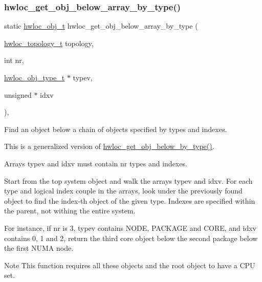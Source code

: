 \subsubsection{\texorpdfstring{hwloc\+\_\+get\+\_\+obj\+\_\+below\+\_\+array\+\_\+by\+\_\+type()}{hwloc\_get\_obj\_below\_array\_by\_type()}}
{\footnotesize\ttfamily static \hyperlink{a00185_ga79b8ab56877ef99ac59b833203391c7d}{hwloc\+\_\+obj\+\_\+t} hwloc\+\_\+get\+\_\+obj\+\_\+below\+\_\+array\+\_\+by\+\_\+type (\begin{DoxyParamCaption}\item[{\hyperlink{a00186_ga9d1e76ee15a7dee158b786c30b6a6e38}{hwloc\+\_\+topology\+\_\+t}}]{topology,  }\item[{int}]{nr,  }\item[{\hyperlink{a00184_gacd37bb612667dc437d66bfb175a8dc55}{hwloc\+\_\+obj\+\_\+type\+\_\+t} $\ast$}]{typev,  }\item[{unsigned $\ast$}]{idxv }\end{DoxyParamCaption})\hspace{0.3cm}{\ttfamily [inline]}, {\ttfamily [static]}}



Find an object below a chain of objects specified by types and indexes. 

This is a generalized version of \hyperlink{a00200_ga7a0c1046851f7a88bd52f5a1d4ba0a97}{hwloc\+\_\+get\+\_\+obj\+\_\+below\+\_\+by\+\_\+type()}.

Arrays {\ttfamily typev} and {\ttfamily idxv} must contain {\ttfamily nr} types and indexes.

Start from the top system object and walk the arrays {\ttfamily typev} and {\ttfamily idxv}. For each type and logical index couple in the arrays, look under the previously found object to find the index-\/th object of the given type. Indexes are specified within the parent, not withing the entire system.

For instance, if nr is 3, typev contains N\+O\+DE, P\+A\+C\+K\+A\+GE and C\+O\+RE, and idxv contains 0, 1 and 2, return the third core object below the second package below the first N\+U\+MA node.

\begin{DoxyNote}{Note}
This function requires all these objects and the root object to have a C\+PU set. 
\end{DoxyNote}
\mbox{\label{a00200_ga7a0c1046851f7a88bd52f5a1d4ba0a97}} 

